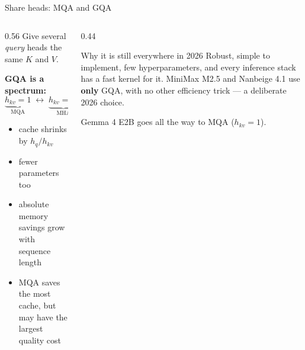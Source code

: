 \documentclass[aspectratio=169,10pt]{beamer}
\begin{document}
\begin{frame}{Share heads: MQA and GQA}
  \begin{columns}[T]
    \begin{column}{0.56\textwidth}
      Give several \emph{query} heads the same $K$ and $V$.
      \vspace{0.5em}

      \textbf{GQA is a spectrum:}
      \[
        \underbrace{h_{kv}=1}_{\text{MQA}} \;\longleftrightarrow\;
        \underbrace{h_{kv}=h_q}_{\text{MHA}}
      \]
      \begin{itemize}
        \item cache shrinks by $h_q/h_{kv}$
        \item fewer parameters too
        \item absolute memory savings grow with sequence length
        \item MQA saves the most cache, but may have the largest quality cost
      \end{itemize}
    \end{column}
    \begin{column}{0.44\textwidth}
      \begin{block}{Why it is still everywhere in 2026}
        \small
        Robust, simple to implement, few hyperparameters, and every inference
        stack has a fast kernel for it.
        \vspace{0.4em}
        MiniMax M2.5 and Nanbeige 4.1 use \textbf{only} GQA, with no other
        efficiency trick --- a deliberate 2026 choice.
      \end{block}
      \vspace{0.3em}
      \small
      Gemma 4 E2B goes all the way to MQA ($h_{kv}=1$).
    \end{column}
  \end{columns}
\end{frame}
\end{document}
